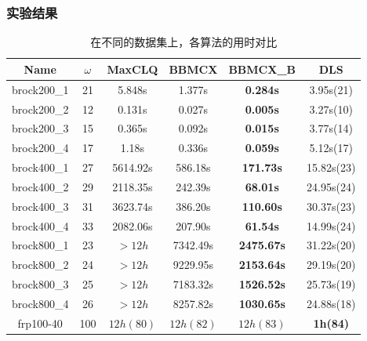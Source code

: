 \documentclass[slidestop,compress,mathserif]{beamer}
\begin{document}
	\begin{frame}
\frametitle {实验结果}
\vspace{1em}
	\begin{adjustwidth}{-2em}{-2em}
		\begin{table}[H]
	\begin{center}
		\begin{tabular}{c|c|c|c|c|c}
			\textbf{Name} & $\omega$ & \textbf{MaxCLQ} & \textbf{BBMCX} & \textbf{BBMCX\_B} & \textbf{DLS}\\
			\hline
brock200\_1 & 21 & 5.848s & 1.377s & \textbf{0.284s} & 3.95s(21) \\
brock200\_2 & 12 & 0.131s & 0.027s & \textbf{0.005s} & 3.27s(10)  \\
brock200\_3 & 15 & 0.365s & 0.092s & \textbf{0.015s} & 3.77s(14)   \\
brock200\_4 & 17 & 1.18s & 0.336s & \textbf{0.059s} & 5.12s(17)   \\
brock400\_1 & 27 & 5614.92s & 586.18s & \textbf{171.73s} & 15.82s(23) \\
brock400\_2 & 29 & 2118.35s & 242.39s & \textbf{68.01s} & 24.95s(24) \\
brock400\_3 & 31 & 3623.74s & 386.20s & \textbf{110.60s} & 30.37s(23)\\
brock400\_4 & 33 & 2082.06s & 207.90s & \textbf{61.54s} & 14.99s(24)\\
brock800\_1 & 23 & $>12h$ & 7342.49s & \textbf{2475.67s} & 31.22s(20)\\
brock800\_2 & 24 & $>12h$ & 9229.95s & \textbf{2153.64s} & 29.19s(20)\\
brock800\_3 & 25 & $>12h$ & 7183.32s & \textbf{1526.52s} & 25.73s(19)\\
brock800\_4 & 26 & $>12h$ & 8257.82s & \textbf{1030.65s} & 24.88s(18)\\
frp100-40 & 100 & $12h(80)$ & $12h(82)$ & $12h(83)$ & \textbf{1h(84)}
		\end{tabular}
		\caption{在不同的数据集上，各算法的用时对比}
	\end{center}
		\end{table}
	\end{adjustwidth}
	\end{frame}
	
\end{document}
